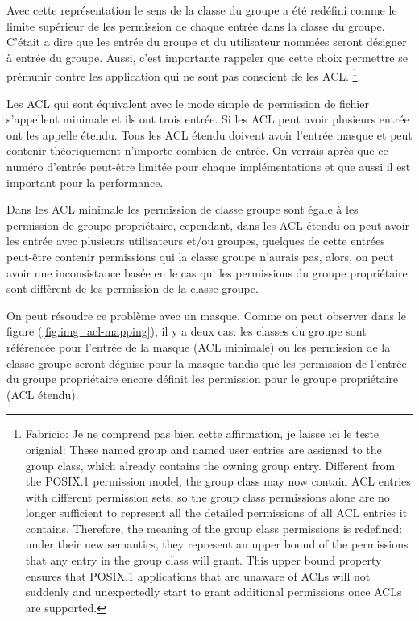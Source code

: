 Avec cette représentation le sens de la classe du groupe a été redéfini comme le limite supérieur de les permission de chaque entrée dans la classe du groupe. C'était a dire que les entrée du groupe et du utilisateur nommées seront désigner à entrée du groupe. Aussi, c'est importante rappeler que cette choix permettre se prémunir contre les application qui ne sont pas conscient de les ACL.
\footnote{Fabricio: Je ne comprend pas bien cette affirmation, je laisse ici le teste orignial:
These named group and named user entries are assigned to the group class, which already contains the owning group entry. Different from the POSIX.1 permission model, the group class may now contain ACL entries with different permission sets, so the group class permissions alone are no longer sufficient to represent all the detailed permissions of all ACL entries it contains. Therefore, the meaning of the group class permissions is redefined: under their new semantics, they represent an upper bound of the permissions that any entry in the group class will grant. This upper bound property ensures that POSIX.1 applications that are unaware of ACLs will not suddenly and unexpectedly start to grant additional permissions once ACLs are supported.}.
 
Les ACL qui sont équivalent avec le mode simple de permission de fichier s'appellent minimale et ils ont trois entrée. Si les ACL peut avoir plusieurs entrée ont les appelle étendu. Tous les ACL étendu doivent avoir l'entrée masque et peut contenir théoriquement n'importe combien de entrée. On verrais après que ce numéro d'entrée peut-être limitée pour chaque implémentations et que aussi il est important pour la performance.
 
Dans les ACL minimale les permission de classe groupe sont égale à les permission de groupe propriétaire, cependant, dans les ACL étendu on peut avoir les entrée avec plusieurs utilisateurs et/ou groupes, quelques de cette entrées peut-être contenir permissions qui la classe groupe n'aurais pas, alors, on peut avoir une inconsistance basée en le cas qui les permissions du groupe propriétaire sont diffèrent de les permission de la classe groupe.
 
On peut résoudre ce problème avec un masque. Comme on peut observer dans le figure (\ref{fig:img_acl-mapping}), il y a deux cas: les classes du groupe sont référencée pour l'entrée de la masque (ACL minimale) ou les permission de la classe groupe seront déguise pour la masque tandis que les permission de l'entrée du groupe propriétaire encore définit les permission pour le groupe propriétaire (ACL étendu).
 
